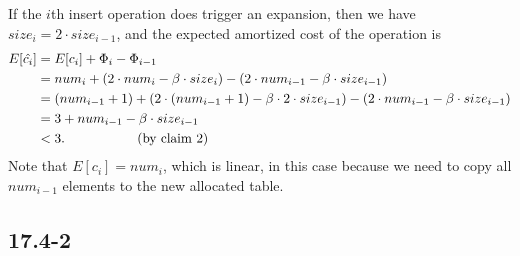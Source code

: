 If the $i$th insert operation does trigger an expansion,
then we have $size_i = 2 \cdot size_{i-1}$, and 
the expected amortized cost of the operation is
\begin{equation*}
\begin{split}
    E[\hat{c_i}] & = E[c_i] + \Phi_i - \Phi_{i-1} \\
    & = num_i + (2 \cdot num_i - \beta \cdot size_i) - (2 \cdot num_{i-1} - \beta \cdot size_{i-1}) \\
    & = (num_{i-1} + 1) + (2 \cdot (num_{i-1} + 1) - \beta \cdot 2 \cdot size_{i-1}) 
        - (2 \cdot num_{i-1} - \beta \cdot size_{i-1}) \\
    & = 3 + num_{i-1} - \beta \cdot size_{i-1} \\
    & < 3 \text{. \quad\quad\quad\quad\quad (by claim 2)}
\end{split}
\end{equation*}
Note that $E[c_i] = num_i$, which is linear, in this case
because we need to copy all $num_{i-1}$ elements 
to the new allocated table.

\subsection*{17.4-2}

